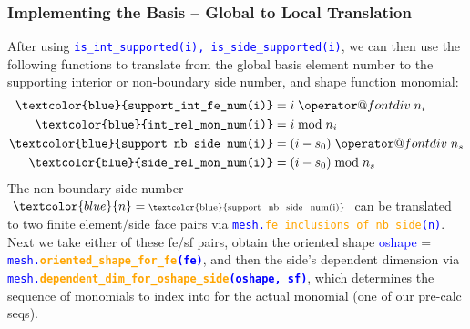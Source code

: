 \documentclass[compress]{beamer}
\makeatletter
\newcommand*{\bdiv}{%
  \nonscript\mskip-\medmuskip\mkern5mu%
  \mathbin{\operator@font div}\penalty900\mkern5mu%
  \nonscript\mskip-\medmuskip
}
\makeatother
\begin{document}
\begin{frame}
  \frametitle{Implementing the Basis -- Global to Local Translation}
  \pause
  After using {\small \texttt{\textcolor{blue}{is\_int\_supported(i), is\_side\_supported(i)}}}, we can then use the following
    functions to translate from the global basis element number to the supporting interior or non-boundary side number,
    and shape function monomial: 
  \pause
  \begin{align*}
    \text{\texttt{\textcolor{blue}{support\_int\_fe\_num(i)}}} &= i \bdiv n_i \\
    \text{{\texttt{\textcolor{blue}{int\_rel\_mon\_num(i)}}}}   &= i \bmod n_i \\
    \text{\texttt{\textcolor{blue}{support\_nb\_side\_num(i)}}} &= (i - s_0) \bdiv n_s \\
    \text{\texttt{\textcolor{blue}{side\_rel\_mon\_num(i)}}} &= (i - s_0) \bmod n_s
  \end{align*}
  \pause
  \uncover<+-> {
    \small  
      The non-boundary side number $\textcolor{blue}{n} = \text{\scriptsize \textcolor{blue}{support\_nb\_side\_num(i)}}$ can be translated
      to two finite element/side face pairs via
      {\scriptsize \texttt{\textcolor{blue}{mesh.\textcolor{orange}{fe\_inclusions\_of\_nb\_side}(n)}}}.
    \uncover<+-> {
      Next we take either of these fe/sf pairs, obtain the oriented shape {\scriptsize \textcolor{blue}{oshape} =}
      {\scriptsize \texttt{\textcolor{blue}{mesh.\textbf{\textcolor{orange}{oriented\_shape\_for\_fe}(fe)}}}}, and then the side's
      dependent dimension via 
      {\scriptsize \texttt{\textcolor{blue}{mesh.\textbf{\textcolor{orange}{dependent\_dim\_for\_oshape\_side}(oshape, sf)}}}},
      which determines the sequence of monomials to index into for the actual monomial (one of our pre-calc seqs).
    }
  }
\end{frame}
\end{document}
